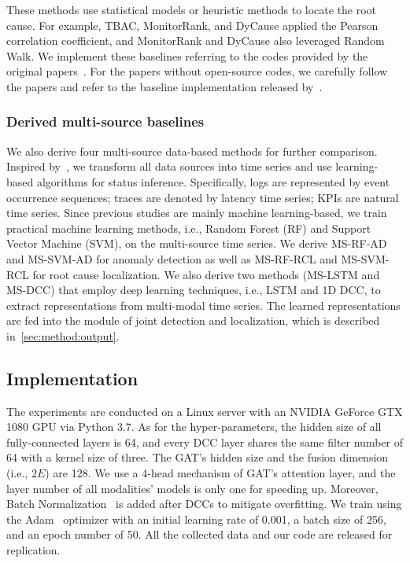 These methods use statistical models or heuristic methods to locate the root cause. For example, TBAC, MonitorRank, and DyCause applied the Pearson correlation coefficient, and MonitorRank and DyCause also leveraged Random Walk.
We implement these baselines referring to the codes provided by the original papers~\cite{TraceAnomaly, DyCause, MicroRank}. For the papers without open-source codes, we carefully follow the papers and refer to the baseline implementation released by~\cite{DyCause}.

\subsubsection{Derived multi-source baselines} \label{sec:setup:derived}
We also derive four multi-source data-based methods for further comparison.
Inspired by~\cite{MMTrace}, we transform all data sources into time series and use learning-based algorithms for status inference. 
Specifically, logs are represented by event occurrence sequences; traces are denoted by latency time series; KPIs are natural time series.
Since previous studies are mainly machine learning-based, we train practical machine learning methods, i.e., Random Forest (RF) and Support Vector Machine (SVM), on the multi-source time series.
We derive MS-RF-AD and MS-SVM-AD for anomaly detection as well as MS-RF-RCL and MS-SVM-RCL for root cause localization.
We also derive two methods (MS-LSTM and MS-DCC) that employ deep learning techniques, i.e., LSTM and 1D DCC, to extract representations from multi-modal time series.
The learned representations are fed into the module of joint detection and localization, which is described in~\ref{sec:method:output}.

\subsection{Implementation}
The experiments are conducted on a Linux server with an NVIDIA GeForce GTX 1080 GPU via Python 3.7. 
As for the hyper-parameters, the hidden size of all fully-connected layers is 64, and every DCC layer shares the same filter number of 64 with a kernel size of three. The GAT's hidden size and the fusion dimension (i.e., $2E$) are 128.
We use a 4-head mechanism of GAT's attention layer, and the layer number of all modalities' models is only one for speeding up.
Moreover, Batch Normalization~\cite{BatchNorm} is added after DCCs to mitigate overfitting.
We train \name using the Adam~\cite{Adam} optimizer with an initial learning rate of 0.001, a batch size of 256, and an epoch number of 50.
All the collected data and our code are released for replication.

